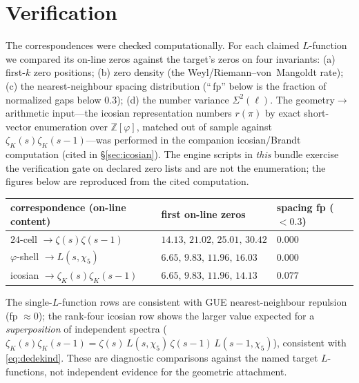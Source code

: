 \documentclass[11pt]{article}
\theoremstyle{definition}
\newcommand{\Z}{\mathbb{Z}}
\newcommand{\zetaK}{\zeta_{K}}
\begin{document}
\section{Verification}\label{sec:verify}
The correspondences were checked computationally. For each claimed $L$-function we
compared its on-line zeros against the target's zeros on four invariants: (a) first-$k$
zero positions; (b) zero density (the Weyl/Riemann--von~Mangoldt rate); (c) the
nearest-neighbour spacing distribution (``\,fp'' below is the fraction of normalized
gaps below $0.3$); (d) the number variance $\Sigma^2(\ell)$. The geometry$\to$arithmetic
input---the icosian representation numbers $r(\pi)$ by exact short-vector enumeration
over $\Z[\varphi]$, matched out of sample against $\zetaK(s)\zetaK(s-1)$---was performed
in the companion icosian/Brandt computation (cited in \S\ref{sec:icosian}). The engine
scripts in \emph{this} bundle exercise the verification gate on declared zero lists and
are not the enumeration; the figures below are reproduced from the cited computation.

\begin{center}\small
\begin{tabular}{lll}
\hline
correspondence (on-line content) & first on-line zeros & spacing fp ($<0.3$)\\
\hline
$24$-cell $\to \zeta(s)\zeta(s-1)$ & $14.13,\,21.02,\,25.01,\,30.42$ & $0.000$\\
$\varphi$-shell $\to L(s,\chi_5)$ & $6.65,\,9.83,\,11.96,\,16.03$ & $0.000$\\
icosian $\to \zetaK(s)\zetaK(s-1)$ & $6.65,\,9.83,\,11.96,\,14.13$ & $0.077$\\
\hline
\end{tabular}
\end{center}
\noindent The single-$L$-function rows are consistent with GUE nearest-neighbour
repulsion (fp $\approx 0$); the rank-four icosian row shows the larger value expected
for a \emph{superposition} of independent spectra
($\zetaK(s)\zetaK(s-1)=\zeta(s)\,L(s,\chi_5)\,\zeta(s-1)\,L(s-1,\chi_5)$), consistent
with \eqref{eq:dedekind}. These are diagnostic comparisons against the named target
$L$-functions, not independent evidence for the geometric attachment.
\end{document}
